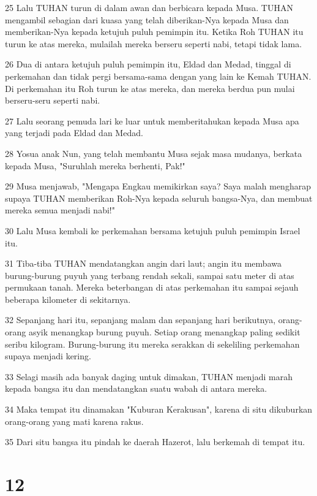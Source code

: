 \par 25 Lalu TUHAN turun di dalam awan dan berbicara kepada Musa. TUHAN mengambil sebagian dari kuasa yang telah diberikan-Nya kepada Musa dan memberikan-Nya kepada ketujuh puluh pemimpin itu. Ketika Roh TUHAN itu turun ke atas mereka, mulailah mereka berseru seperti nabi, tetapi tidak lama.
\par 26 Dua di antara ketujuh puluh pemimpin itu, Eldad dan Medad, tinggal di perkemahan dan tidak pergi bersama-sama dengan yang lain ke Kemah TUHAN. Di perkemahan itu Roh turun ke atas mereka, dan mereka berdua pun mulai berseru-seru seperti nabi.
\par 27 Lalu seorang pemuda lari ke luar untuk memberitahukan kepada Musa apa yang terjadi pada Eldad dan Medad.
\par 28 Yosua anak Nun, yang telah membantu Musa sejak masa mudanya, berkata kepada Musa, "Suruhlah mereka berhenti, Pak!"
\par 29 Musa menjawab, "Mengapa Engkau memikirkan saya? Saya malah mengharap supaya TUHAN memberikan Roh-Nya kepada seluruh bangsa-Nya, dan membuat mereka semua menjadi nabi!"
\par 30 Lalu Musa kembali ke perkemahan bersama ketujuh puluh pemimpin Israel itu.
\par 31 Tiba-tiba TUHAN mendatangkan angin dari laut; angin itu membawa burung-burung puyuh yang terbang rendah sekali, sampai satu meter di atas permukaan tanah. Mereka beterbangan di atas perkemahan itu sampai sejauh beberapa kilometer di sekitarnya.
\par 32 Sepanjang hari itu, sepanjang malam dan sepanjang hari berikutnya, orang-orang asyik menangkap burung puyuh. Setiap orang menangkap paling sedikit seribu kilogram. Burung-burung itu mereka serakkan di sekeliling perkemahan supaya menjadi kering.
\par 33 Selagi masih ada banyak daging untuk dimakan, TUHAN menjadi marah kepada bangsa itu dan mendatangkan suatu wabah di antara mereka.
\par 34 Maka tempat itu dinamakan "Kuburan Kerakusan", karena di situ dikuburkan orang-orang yang mati karena rakus.
\par 35 Dari situ bangsa itu pindah ke daerah Hazerot, lalu berkemah di tempat itu.

\chapter{12}

